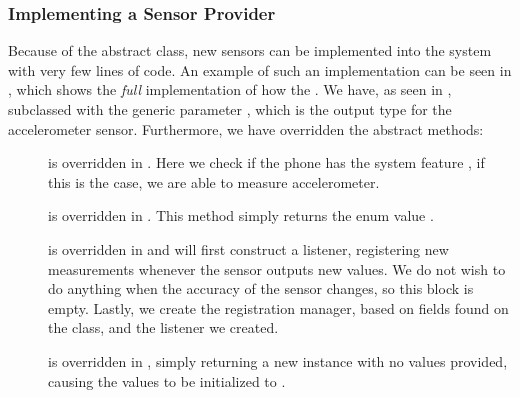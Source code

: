 \subsubsection{Implementing a Sensor Provider}
Because of the abstract  class, new sensors can be implemented into the system with very few lines of code. An example of such an implementation can be seen in , which shows the \emph{full} implementation of how the . We have, as seen in , subclassed  with the generic parameter , which is the output type for the accelerometer sensor. Furthermore, we have overridden the abstract methods: 

\begin{description}
  \item[] is overridden in . Here we check if the phone has the system feature , if this is the case, we are able to measure accelerometer.

  \item[] is overridden in . This method simply returns the enum value .

  \item[] is overridden in  and will first construct a listener, registering new measurements whenever the sensor outputs new values. We do not wish to do anything when the accuracy of the sensor changes, so this block is empty. Lastly, we create the registration manager, based on fields found on the  class, and the listener we created.

  \item[] is overridden in , simply returning a new  instance with no values provided, causing the values to be initialized to .
\end{description}


\FloatBarrier

